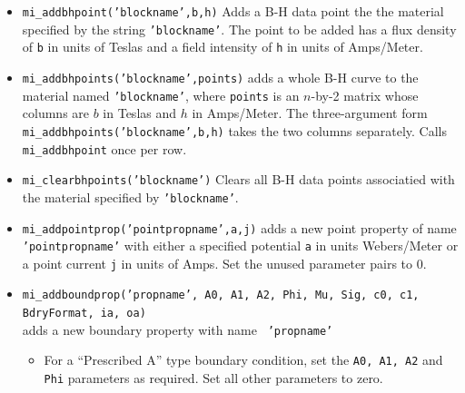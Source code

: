 \begin{itemize}
\begin{itemize}
\begin{itemize}
                \end{itemize}
        \item{\tt Phi\_hx} Hysteresis lag in degrees in the x-direction for linear problems.
        \item{\tt Phi\_hy} Hysteresis lag in degrees in the y-direction for linear problems.
		\item{\tt nstr} Number of strands in the wire build. Should be 1 for Magnet or Square wire.
		\item{\tt dwire} Diameter of each of the wire's constituent strand in millimeters.
        \end{itemize}
Note that not all properties need be defined -- properties that aren't defined are assigned default
values.


\item{\tt mi\_addbhpoint('blockname',b,h)} Adds a B-H data point the
the material specified by the string {\tt 'blockname'}.  The point to be added
has a flux density of {\tt b} in units of Teslas and a field
intensity of {\tt h} in units of Amps/Meter.

\item{\tt mi\_addbhpoints('blockname',points)} adds a whole B-H curve to the material named {\tt 'blockname'}, where {\tt points} is an $n$-by-2 matrix whose columns are $b$ in Teslas and $h$ in Amps/Meter. The three-argument form {\tt mi\_addbhpoints('blockname',b,h)} takes the two columns separately. Calls {\tt mi\_addbhpoint} once per row.

\item{\tt mi\_clearbhpoints('blockname')} Clears all B-H data points
associatied with the material specified by {\tt 'blockname'}.

\item{\tt mi\_addpointprop('pointpropname',a,j)}
adds a new point property of name {\tt 'pointpropname'} with either
a specified potential {\tt a} in units Webers/Meter
or a point current {\tt j} in units of Amps. Set the
unused parameter pairs to 0.

\item{\tt mi\_addboundprop('propname', A0, A1, A2, Phi, Mu, Sig, c0, c1,
BdryFormat, ia, oa)} \\ adds a new boundary property with name {\tt
'propname'}
        \begin{itemize}
        \item For a ``Prescribed A'' type boundary condition, set the {\tt A0,
        A1, A2} and {\tt Phi} parameters as required. Set all other
        parameters to zero.


\end{itemize}
\end{itemize}
